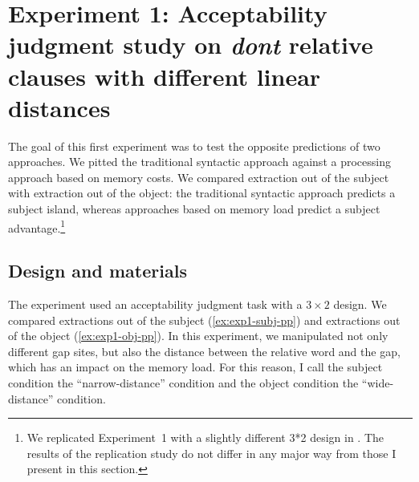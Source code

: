 \section[head=Experiment 1]{Experiment 1: Acceptability judgment study on \emph{dont} relative clauses with different linear distances}
\label{ch:exp01}
\largerpage[2.25]

The goal of this first experiment was to test the opposite predictions of two approaches. We pitted the traditional syntactic approach against a processing approach based on memory costs. We compared extraction out of the subject with extraction out of the object: the traditional syntactic approach predicts a subject island, whereas approaches based on memory load predict a subject advantage.\footnote{We replicated Experiment~1 with a slightly different 3*2 design in \citet{Abeille.2020.Cognition}. The results of the replication study do not differ in any major way from those I present in this section.}

\subsection{Design and materials}

The experiment used an acceptability judgment task with a $3\times 2$ design. 
We compared extractions out of the subject (\ref{ex:exp1-subj-pp}) and extractions out of the object (\ref{ex:exp1-obj-pp}). In this experiment, we manipulated not only different gap sites, but also the distance between the relative word and the gap, which has an impact on the memory load. For this reason, I call the subject condition the ``narrow-distance'' condition and the object condition the ``wide-distance'' condition.

\eal 
{}
\label{ex:exp1-subj-pp}
\label{ex:exp1-obj-pp}
\zl 

